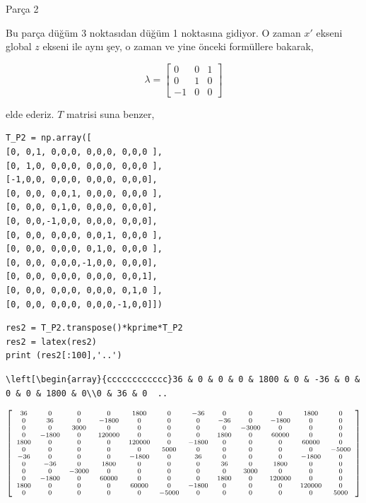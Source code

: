 \documentclass[12pt,fleqn]{article}\usepackage{../../common}
\begin{document}
Parça 2

Bu parça düğüm 3 noktasıdan düğüm 1 noktasına gidiyor. O zaman $x'$ ekseni
global $z$ ekseni ile aynı şey, o zaman ve yine önceki formüllere bakarak,

$$
\lambda = \left[\begin{array}{ccc}
0 & 0 & 1 \\ 0 & 1 & 0 \\ -1 & 0 & 0
\end{array}\right]
$$

elde ederiz. $T$ matrisi suna benzer,

\begin{verbatim}
T_P2 = np.array([
[0, 0,1, 0,0,0, 0,0,0, 0,0,0 ],
[0, 1,0, 0,0,0, 0,0,0, 0,0,0 ],
[-1,0,0, 0,0,0, 0,0,0, 0,0,0],
[0, 0,0, 0,0,1, 0,0,0, 0,0,0 ],
[0, 0,0, 0,1,0, 0,0,0, 0,0,0],
[0, 0,0,-1,0,0, 0,0,0, 0,0,0],
[0, 0,0, 0,0,0, 0,0,1, 0,0,0 ],
[0, 0,0, 0,0,0, 0,1,0, 0,0,0 ],
[0, 0,0, 0,0,0,-1,0,0, 0,0,0],
[0, 0,0, 0,0,0, 0,0,0, 0,0,1],
[0, 0,0, 0,0,0, 0,0,0, 0,1,0 ],
[0, 0,0, 0,0,0, 0,0,0,-1,0,0]])
\end{verbatim}

\begin{verbatim}
res2 = T_P2.transpose()*kprime*T_P2
res2 = latex(res2)
print (res2[:100],'..')
\end{verbatim}

\begin{verbatim}
\left[\begin{array}{cccccccccccc}36 & 0 & 0 & 0 & 1800 & 0 & -36 & 0 & 0 & 0 & 1800 & 0\\0 & 36 & 0  ..
\end{verbatim}

$$
\scriptsize
\left[\begin{array}{cccccccccccc}36 & 0 & 0 & 0 & 1800 & 0 & -36 & 0 & 0 & 0 &
    1800 & 0\\0 & 36 & 0 & -1800 & 0 & 0 & 0 & -36 & 0 & -1800 & 0 & 0\\0 & 0 &
    3000 & 0 & 0 & 0 & 0 & 0 & -3000 & 0 & 0 & 0\\0 & -1800 & 0 & 120000 & 0 & 0
    & 0 & 1800 & 0 & 60000 & 0 & 0\\1800 & 0 & 0 & 0 & 120000 & 0 & -1800 & 0 &
    0 & 0 & 60000 & 0\\0 & 0 & 0 & 0 & 0 & 5000 & 0 & 0 & 0 & 0 & 0 & -5000\\-36
    & 0 & 0 & 0 & -1800 & 0 & 36 & 0 & 0 & 0 & -1800 & 0\\0 & -36 & 0 & 1800 & 0
    & 0 & 0 & 36 & 0 & 1800 & 0 & 0\\0 & 0 & -3000 & 0 & 0 & 0 & 0 & 0 & 3000 &
    0 & 0 & 0\\0 & -1800 & 0 & 60000 & 0 & 0 & 0 & 1800 & 0 & 120000 & 0 &
    0\\1800 & 0 & 0 & 0 & 60000 & 0 & -1800 & 0 & 0 & 0 & 120000 & 0\\0 & 0 & 0
    & 0 & 0 & -5000 & 0 & 0 & 0 & 0 & 0 & 5000\end{array}\right]
$$
\end{document}
